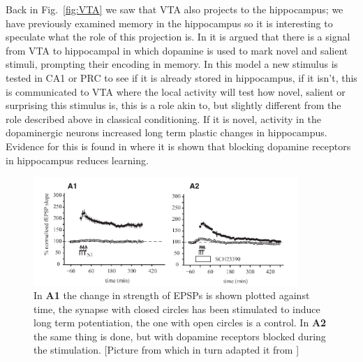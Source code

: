 \documentclass[11pt,a4paper]{scrartcl}
\begin{document}
Back in Fig.~\ref{fig:VTA} we saw that VTA also projects to the
hippocampus; we have previously examined memory in the hippocampus so
it is interesting to speculate what the role of this projection is. In
\cite{LismanGrace2005a} it is argued that there is a signal from VTA
to hippocampal in which dopamine is used to mark novel and salient
stimuli, prompting their encoding in memory. In this model a new
stimulus is tested in CA1 or PRC to see if it is already stored in
hippocampus, if it isn't, this is communicated to VTA where the local
activity will test how novel, salient or surprising this stimulus is,
this is a role akin to, but slightly different from the role described
above in classical conditioning. If it is novel, activity in the
dopaminergic neurons increased long term plastic changes in
hippocampus. Evidence for this is found in \cite{MorrisEtAl2003a}
where it is shown that blocking dopamine receptors in hippocampus
reduces learning.

\begin{figure}
\begin{center}
\includegraphics[width=10cm]{dopamine_learning.png}
\end{center}
\caption{In \textbf{A1} the change in strength of EPSPs is shown
  plotted against time, the synapse with closed circles has been
  stimulated to induce long term potentiation, the one with open
  circles is a control. In \textbf{A2} the same thing is done, but
  with dopamine receptors blocked during the stimulation. [Picture
    from \cite{LismanGrace2005a} which in turn adapted it from
    \cite{MorrisEtAl2003a}]\label{fig:hippocampus}}
\end{figure}
\end{document}
